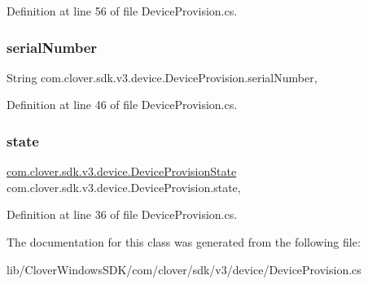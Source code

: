Definition at line 56 of file Device\+Provision.\+cs.

\mbox{\label{classcom_1_1clover_1_1sdk_1_1v3_1_1device_1_1_device_provision_ab5f83945f67778103595c9a69e2f1dfb}} 
\subsubsection{\texorpdfstring{serial\+Number}{serialNumber}}
{\footnotesize\ttfamily String com.\+clover.\+sdk.\+v3.\+device.\+Device\+Provision.\+serial\+Number\hspace{0.3cm}{\ttfamily [get]}, {\ttfamily [set]}}



Definition at line 46 of file Device\+Provision.\+cs.

\mbox{\label{classcom_1_1clover_1_1sdk_1_1v3_1_1device_1_1_device_provision_a5119d3d7c23e740cb4906ef3b3f24c83}} 
\subsubsection{\texorpdfstring{state}{state}}
{\footnotesize\ttfamily \hyperlink{namespacecom_1_1clover_1_1sdk_1_1v3_1_1device_a91531b18ad063f2ee84a585d774b2d56}{com.\+clover.\+sdk.\+v3.\+device.\+Device\+Provision\+State} com.\+clover.\+sdk.\+v3.\+device.\+Device\+Provision.\+state\hspace{0.3cm}{\ttfamily [get]}, {\ttfamily [set]}}



Definition at line 36 of file Device\+Provision.\+cs.



The documentation for this class was generated from the following file\+:\begin{DoxyCompactItemize}
\item 
lib/\+Clover\+Windows\+S\+D\+K/com/clover/sdk/v3/device/Device\+Provision.\+cs\end{DoxyCompactItemize}
